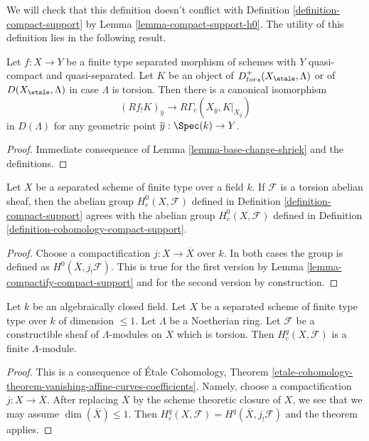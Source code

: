 \noindent
We will check that this definition doesn't conflict with
Definition \ref{definition-compact-support} by
Lemma \ref{lemma-compact-support-h0}.
The utility of this definition lies in the following result.

\begin{lemma}
\label{lemma-stalk-R-f-shriek}
Let $f : X \to Y$ be a finite type separated morphism of schemes
with $Y$ quasi-compact and quasi-separated. Let $K$ be an object of
$D^+_{tors}(X_\etale, \Lambda)$ or of $D(X_\etale, \Lambda)$ in case
$\Lambda$ is torsion. Then there is a canonical isomorphism
$$
(Rf_!K)_{\overline{y}}
\longrightarrow
R\Gamma_c(X_{\overline{y}}, K|_{X_{\overline{y}}})
$$
in $D(\Lambda)$ for any geometric point $\overline{y} : \Spec(k) \to Y$.
\end{lemma}

\begin{proof}
Immediate consequence of Lemma \ref{lemma-base-change-shriek} and the
definitions.
\end{proof}

\begin{lemma}
\label{lemma-compact-support-h0}
Let $X$ be a separated scheme of finite type over a field $k$.
If $\mathcal{F}$ is a torsion abelian sheaf, then the abelian group
$H^0_c(X, \mathcal{F})$ defined in Definition \ref{definition-compact-support}
agrees with the abelian group $H^0_c(X, \mathcal{F})$ defined in
Definition \ref{definition-cohomology-compact-support}.
\end{lemma}

\begin{proof}
Choose a compactification $j : X \to \overline{X}$ over $k$.
In both cases the group is defined as $H^0(\overline{X}, j_!\mathcal{F})$.
This is true for the first version by
Lemma \ref{lemma-compactify-compact-support}
and for the second version by construction.
\end{proof}

\begin{lemma}
\label{lemma-finiteness-curves}
Let $k$ be an algebraically closed field. Let $X$ be a separated
scheme of finite type type over $k$ of dimension $\leq 1$.
Let $\Lambda$ be a Noetherian ring.
Let $\mathcal{F}$ be a constructible sheaf of $\Lambda$-modules
on $X$ which is torsion. Then $H^q_c(X, \mathcal{F})$ is a
finite $\Lambda$-module.
\end{lemma}

\begin{proof}
This is a consequence of \'Etale Cohomology, Theorem
\ref{etale-cohomology-theorem-vanishing-affine-curves-coefficients}.
Namely, choose a compactification $j : X \to \overline{X}$.
After replacing $\overline{X}$ by the scheme theoretic closure
of $X$, we see that we may assume $\dim(\overline{X}) \leq 1$.
Then $H^q_c(X, \mathcal{F}) = H^q(\overline{X}, j_!\mathcal{F})$
and the theorem applies.
\end{proof}





